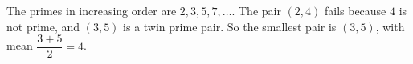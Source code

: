 The primes in increasing order are $2,3,5,7,\dots$. The pair $(2,4)$ fails because $4$ is not prime, and $(3,5)$ is a twin prime pair. So the smallest pair is $(3,5)$, with mean $\dfrac{3+5}{2}=\boxed{4}$.
